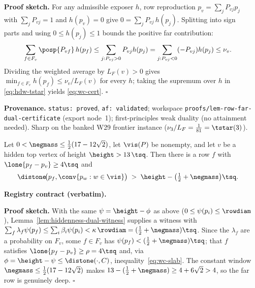 \noindent\textbf{Proof sketch.} For any admissible exposer $h$, row reproduction
$p_v=\sum_j P_{vj}p_j$ with $\sum_j P_{vj}=1$ and $h(p_v)=0$ give $0=\sum_j P_{vj}\,h(p_j)$. Splitting
into sign parts and using $0\le h(p_j)\le1$ bounds the positive far contribution:
\[
  \sum_{f\in F_v}\posp{P_{vf}}\,h(p_f)\le\sum_{j:P_{vj}>0}P_{vj}h(p_j)=\sum_{j:P_{vj}<0}(-P_{vj})h(p_j)\le\nu_v .
\]
Dividing the weighted average by $L_F(v)>0$ gives $\min_{f\in F_v}h(p_f)\le\nu_v/L_F(v)$ for every $h$;
taking the supremum over $h$ in \eqref{eq:hdw-tstar} yields \eqref{eq:wc-cert}. \hfill$\square$

\noindent\textbf{Provenance.} \texttt{status: proved}, \texttt{af: validated}; workspace
\texttt{proofs/lem-row-far-dual-certificate} (export node~1); first-principles weak duality (no
attainment needed). Sharp on the banked W29 frontier instance ($\nu_3/L_F=\tfrac1{81}=\tstar(3)$).

\begin{lemma}\label{lem:top-slab-companion}
Let $0<\negmass\le\tfrac12(17-12\sqrt2)$, let $\vis(P)$ be nonempty, and let $v$ be a hidden top vertex
of height $\height>13\,\tsq$. Then there is a row $f$ with $\lone{p_f-p_v}\ge4\tsq$ and
\begin{equation}\label{eq:wc-slab}
  \distone\!\bigl(p_f,\conv\{p_w:w\in\vis\}\bigr)\;>\;\height-\bigl(\tfrac12+\negmass\bigr)\tsq .
\end{equation}
\end{lemma}

\noindent\textbf{Registry contract (verbatim).}

\noindent\textbf{Proof sketch.} With the same $\psi=\height-\phi$ as above ($0\le\psi(p_i)\le\rowdiam$),
Lemma~\ref{lem:hiddenness-dual-witness} supplies a witness with
$\sum_f\lambda_f\psi(p_f)\le\sum_i\beta_i\psi(p_i)<\kappa\,\rowdiam=(\tfrac12+\negmass)\tsq$. Since the
$\lambda_f$ are a probability on $F_v$, some $f\in F_v$ has $\psi(p_f)<(\tfrac12+\negmass)\tsq$; that
$f$ satisfies $\lone{p_f-p_v}\ge\rho=4\tsq$ and, via $\phi=\height-\psi\le\distone(\cdot,C)$,
inequality~\eqref{eq:wc-slab}. The constant window $\negmass\le\tfrac12(17-12\sqrt2)$ makes
$13-(\tfrac12+\negmass)\ge4+6\sqrt2>4$, so the far row is genuinely deep. \hfill$\square$

